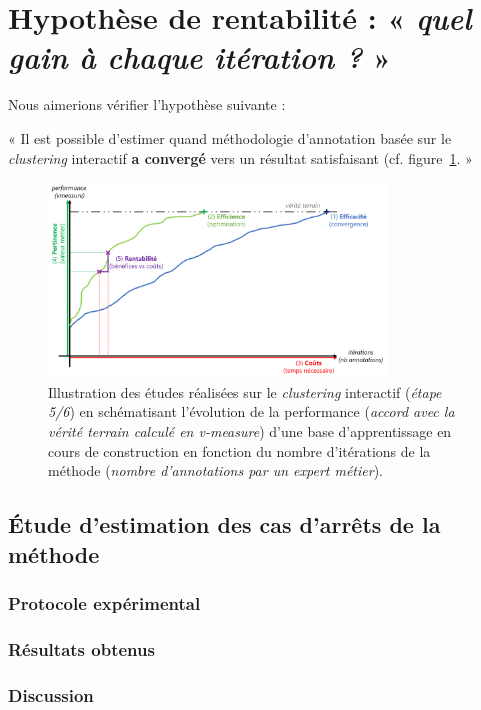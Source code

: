 \section{Hypothèse de rentabilité : « \textit{quel gain à chaque itération ?} »}
\label{section:4.5-HYPOTHESE-RENTABILITE}

	Nous aimerions vérifier l'hypothèse suivante :

	\begin{tcolorbox}[
		title=\faVial~\textbf{Hypothèse de rentabilité}~\faVial,
		colback=colorTcolorboxHypothesis!15,  %
		colframe=colorTcolorboxHypothesis!75,  %
		width=\linewidth
	]
		« Il est possible d'estimer quand méthodologie d'annotation basée sur le \textit{clustering} interactif \textbf{a convergé} vers un résultat satisfaisant (cf. figure~\ref{figure:4.5-HYPOTHESE-RENTABILITE}. »
		
		
		\begin{figure}[H]
			\centering
			\includegraphics[width=0.8\textwidth]{figures/hypotheses-05-rentabilite}
			\caption{Illustration des études réalisées sur le \textit{clustering} interactif (\textit{étape 5/6}) en schématisant l'évolution de la performance (\textit{accord avec la vérité terrain calculé en v-measure}) d'une base d'apprentissage en cours de construction en fonction du nombre d'itérations de la méthode (\textit{nombre d'annotations par un expert métier}).}
			\label{figure:4.5-HYPOTHESE-RENTABILITE}
		\end{figure}

	\end{tcolorbox}
	
	\subsection{Étude d'estimation des cas d'arrêts de la méthode}
	
		\subsubsection{Protocole expérimental}

		\subsubsection{Résultats obtenus}

		\subsubsection{Discussion}